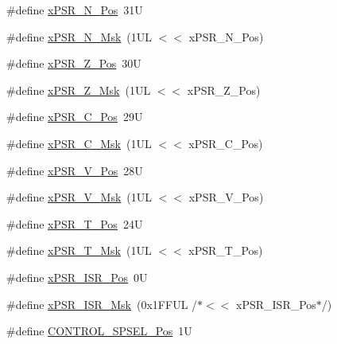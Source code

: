 \begin{DoxyCompactItemize}
\item 
\#define \mbox{\hyperlink{group___c_m_s_i_s___c_o_r_e_ga031eb1b8ebcdb3d602d0b9f2ec82a7ae}{x\+P\+S\+R\+\_\+\+N\+\_\+\+Pos}}~31U
\item 
\#define \mbox{\hyperlink{group___c_m_s_i_s___c_o_r_e_gaf600f4ff41b62cf2f3b0a59b6d2e93d6}{x\+P\+S\+R\+\_\+\+N\+\_\+\+Msk}}~(1\+U\+L $<$$<$ x\+P\+S\+R\+\_\+\+N\+\_\+\+Pos)
\item 
\#define \mbox{\hyperlink{group___c_m_s_i_s___c_o_r_e_ga5869dd608eea73c80f0567d781d2230b}{x\+P\+S\+R\+\_\+\+Z\+\_\+\+Pos}}~30U
\item 
\#define \mbox{\hyperlink{group___c_m_s_i_s___c_o_r_e_ga907599209fba99f579778e662021c4f2}{x\+P\+S\+R\+\_\+\+Z\+\_\+\+Msk}}~(1\+U\+L $<$$<$ x\+P\+S\+R\+\_\+\+Z\+\_\+\+Pos)
\item 
\#define \mbox{\hyperlink{group___c_m_s_i_s___c_o_r_e_ga14adb79b91f6634b351a1b57394e2db6}{x\+P\+S\+R\+\_\+\+C\+\_\+\+Pos}}~29U
\item 
\#define \mbox{\hyperlink{group___c_m_s_i_s___c_o_r_e_ga21e2497255d380f956ca0f48d11d0775}{x\+P\+S\+R\+\_\+\+C\+\_\+\+Msk}}~(1\+U\+L $<$$<$ x\+P\+S\+R\+\_\+\+C\+\_\+\+Pos)
\item 
\#define \mbox{\hyperlink{group___c_m_s_i_s___c_o_r_e_gae0cfbb394490db402623d97e6a979e00}{x\+P\+S\+R\+\_\+\+V\+\_\+\+Pos}}~28U
\item 
\#define \mbox{\hyperlink{group___c_m_s_i_s___c_o_r_e_gab07f94ed3b6ee695f5af719dc27995c2}{x\+P\+S\+R\+\_\+\+V\+\_\+\+Msk}}~(1\+U\+L $<$$<$ x\+P\+S\+R\+\_\+\+V\+\_\+\+Pos)
\item 
\#define \mbox{\hyperlink{group___c_m_s_i_s___c_o_r_e_ga98d801da9a49cda944f52aeae104dd38}{x\+P\+S\+R\+\_\+\+T\+\_\+\+Pos}}~24U
\item 
\#define \mbox{\hyperlink{group___c_m_s_i_s___c_o_r_e_ga30ae2111816e82d47636a8d4577eb6ee}{x\+P\+S\+R\+\_\+\+T\+\_\+\+Msk}}~(1\+U\+L $<$$<$ x\+P\+S\+R\+\_\+\+T\+\_\+\+Pos)
\item 
\#define \mbox{\hyperlink{group___c_m_s_i_s___c_o_r_e_ga21bff245fb1aef9683f693d9d7bb2233}{x\+P\+S\+R\+\_\+\+I\+S\+R\+\_\+\+Pos}}~0U
\item 
\#define \mbox{\hyperlink{group___c_m_s_i_s___c_o_r_e_gadf8eed87e0081dfe1ef1c78a0ea91afd}{x\+P\+S\+R\+\_\+\+I\+S\+R\+\_\+\+Msk}}~(0x1\+F\+F\+U\+L /$\ast$$<$$<$ x\+P\+S\+R\+\_\+\+I\+S\+R\+\_\+\+Pos$\ast$/)
\item 
\#define \mbox{\hyperlink{group___c_m_s_i_s___c_o_r_e_ga07eafc53e609895342c6a530e9d01310}{C\+O\+N\+T\+R\+O\+L\+\_\+\+S\+P\+S\+E\+L\+\_\+\+Pos}}~1U
\item 
$$
\end{DoxyCompactItemize}
